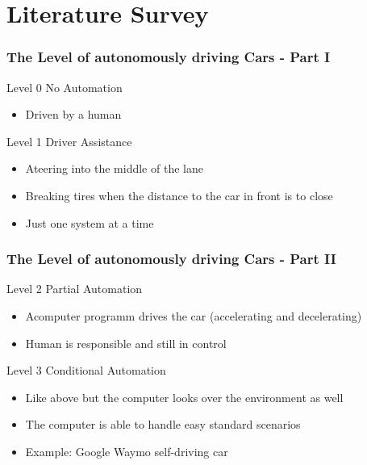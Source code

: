 \documentclass{beamer}
\begin{document}
\section{Literature Survey}
%
\begin{frame}
\frametitle{The Level of autonomously driving Cars - Part I}
\begin{block}{Level 0}
No Automation
\begin{itemize}
\item Driven by a human
\end{itemize}
\end{block}
\begin{block}{Level 1}
Driver Assistance
\begin{itemize}
\item Ateering into the middle of the lane
\item Breaking tires when the distance to the car in front is to close
\item Just one system at a time 
\end{itemize}
\end{block}
\end{frame}
%
%
\begin{frame}
\frametitle{The Level of autonomously driving Cars - Part II}
\begin{block}{Level 2}
Partial Automation
\begin{itemize}
\item Acomputer programm drives the car (accelerating and decelerating)
\item Human is responsible and still in control
\end{itemize}
\end{block}
\begin{block}{Level 3}
Conditional Automation
\begin{itemize}
\item Like above but the computer looks over the environment as well
\item The computer is able to handle easy  standard scenarios
\item Example: Google Waymo self-driving car 
\end{itemize}
\end{block}
\end{frame}
%
%
\end{document}

